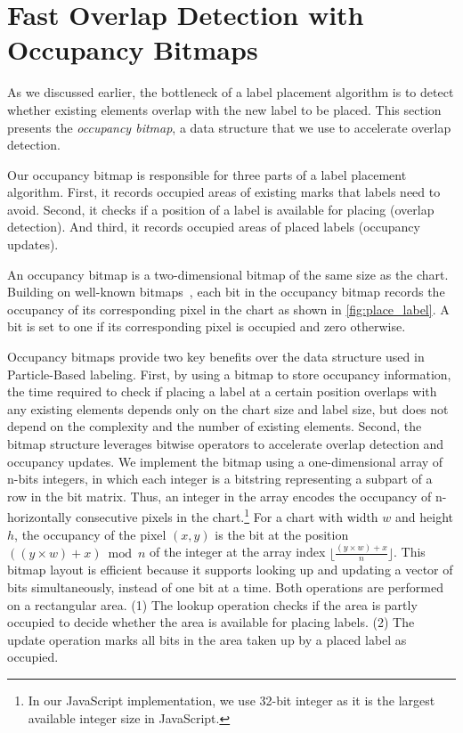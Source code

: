 \section{Fast Overlap Detection with Occupancy Bitmaps}

As we discussed earlier, the bottleneck of a label placement algorithm is to detect whether existing elements overlap with the new label to be placed.
This section presents the \emph{occupancy bitmap}, a data structure that we use to accelerate overlap detection.

Our occupancy bitmap is responsible for three parts of a label placement algorithm.
First, it records occupied areas of existing marks that labels need to avoid.
Second, it checks if a position of a label is available for placing (overlap detection).
And third, it records occupied areas of placed labels (occupancy updates).

An occupancy bitmap is a two-dimensional bitmap of the same size as the chart.
Building on well-known bitmaps~\cite{wiki:bitarray}, each bit in the occupancy bitmap records the occupancy of its corresponding pixel in the chart as shown in
\autoref{fig:place_label}.
A bit is set to one if its corresponding pixel is occupied and zero otherwise.

Occupancy bitmaps provide two key benefits over the data structure used in Particle-Based labeling.
First, by using a bitmap to store occupancy information, the time required to check if placing a label at a certain position overlaps with any existing elements depends only on the chart size and label size, but does not depend on the complexity and the number of existing elements.
Second, the bitmap structure leverages bitwise operators to accelerate overlap detection and occupancy updates.
We implement the bitmap using a one-dimensional array of n-bits integers, in which each integer is a bitstring representing
a subpart of a row in the bit matrix.
Thus, an integer in the array encodes the occupancy of n-horizontally consecutive pixels in the chart.\footnote{In our JavaScript implementation, we use 32-bit integer as it is the largest available integer size in JavaScript.}
For a chart with width $w$ and height $h$, the occupancy of the pixel $(x, y)$
is the bit at the position $((y \times w) + x) \bmod n$ of the integer at the array index $\lfloor\frac{(y \times w) + x}{n}\rfloor$.
This bitmap layout is efficient because it supports looking up and updating a vector of bits simultaneously, instead of one bit at a time.
Both operations are performed on a rectangular area.
(1) The lookup operation checks if the area is partly occupied to decide whether the area is available for placing labels.
(2) The update operation marks all bits in the area taken up by a placed label as occupied.


